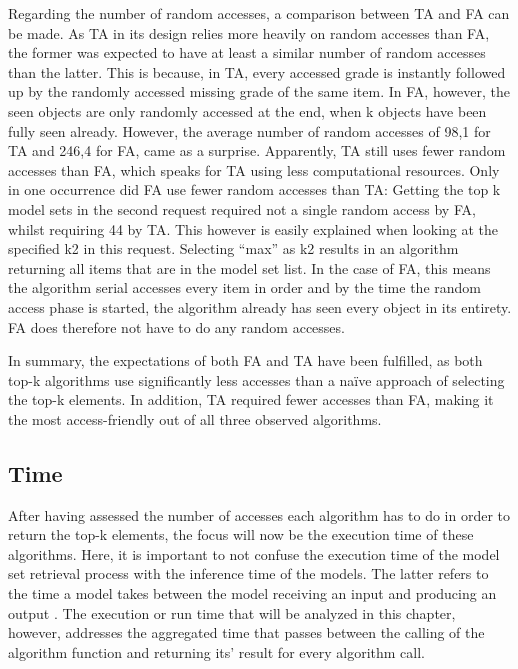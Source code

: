 Regarding the number of random accesses, a comparison between TA and FA can be made. As TA in its design relies more heavily on random accesses than FA, the former was expected to have at least a similar number of random accesses than the latter. This is because, in TA, every accessed grade is instantly followed up by the randomly accessed missing grade of the same item. In FA, however, the seen objects are only randomly accessed at the end, when k objects have been fully seen already. However, the average number of random accesses of 98,1 for TA and 246,4 for FA, came as a surprise. Apparently, TA still uses fewer random accesses than FA, which speaks for TA using less computational resources. Only in one occurrence did FA use fewer random accesses than TA: Getting the top k model sets in the second request required not a single random access by FA, whilst requiring 44 by TA. This however is easily explained when looking at the specified k2 in this request. Selecting “max” as k2 results in an algorithm returning all items that are in the model set list. In the case of FA, this means the algorithm serial accesses every item in order and by the time the random access phase is started, the algorithm already has seen every object in its entirety. FA does therefore not have to do any random accesses.

In summary, the expectations of both FA and TA have been fulfilled, as both top-k algorithms use significantly less accesses than a naïve approach of selecting the top-k elements. In addition, TA required fewer accesses than FA, making it the most access-friendly out of all three observed algorithms. 



\subsection{Time}

After having assessed the number of accesses each algorithm has to do in order to return the top-k elements, the focus will now be the execution time of these algorithms. Here, it is important to not confuse the execution time of the model set retrieval process with the inference time of the models. The latter refers to the time a model takes between the model receiving an input and producing an output \cite{marco2019}. The execution or run time that will be analyzed in this chapter, however, addresses the aggregated time that passes between the calling of the algorithm function and returning its’ result for every algorithm call. 

